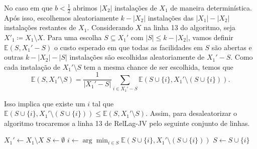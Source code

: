 No caso em que $b < \frac{1}{2}$ abrimos $|X_2|$ instalações de $X_1$ de maneira determinística. Após isso, escolhemos aleatoriamente $k - |X_2|$ instalações das $|X_1| - |X_2|$ instalações restantes de $X_1$. Considerando $X$ na linha 13 do algoritmo, seja $X'_1 \coloneqq X_1 \setminus X$. Para uma escolha $S \subseteq X_1'$ com $|S| \leq k - |X_2|$, vamos definir $\mathbb{E}(S,X_1' - S)$ o custo esperado em que todas as facilidades em $S$ são abertas e outras $k - |X_2| - |S|$ instalações são escolhidas aleatoriamente de $X_1' - S$. Como cada instalação de $X_1' \setminus S$ tem a mesma chance de ser escolhida, temos que 
\[ \mathbb{E}(S,X_1' \setminus S) = \frac{1}{|X_1' - S|}\sum_{i \in X_1' - S} \mathbb{E}(S \cup \{i\}, X_1' \setminus \left( S \cup \{i\}\right)).\]

Isso implica que existe um $i$ tal que $\mathbb{E}(S \cup \{i\}, X_1' \setminus (S \cup \{i\})) \leq \mathbb{E}(S,X_1' \setminus S)$. Assim, para desaleatorizar o algoritmo trocaremos a linha 13 de {\sc RelLag-JV} pelo seguinte conjunto de linhas.
\begin{algorithm}
    \begin{algorithmic}[1]
        \State $X_1' \gets X_1 \setminus X$
        \State $S \gets \emptyset$
        \State $i \gets \arg\min_{i\in S} \mathbb{E}(S \cup \{i\}, X_1' \setminus \left( S \cup \{i\}\right))$
        \State $S \gets S \cup \{i\}$
        \EndWhile
    \end{algorithmic}
\end{algorithm}